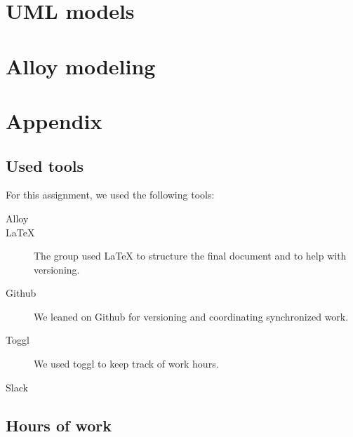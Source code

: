\documentclass{article}
\begin{document}
	\newpage
	\section{UML models}
	

	\newpage
	\section{Alloy modeling}

	\newpage
	\section{Appendix}
		\listoffigures
		\listoftables
		
		\subsection{Used tools}
		For this assignment, we used the following tools:
		
		\begin{description}
			\item [Alloy]
			\item [LaTeX] The group used LaTeX to structure the final document and to help with versioning.
			\item [Github] We leaned on Github for versioning and coordinating synchronized work.
			\item [Toggl] We used toggl to keep track of work hours.
			\item [Slack]  
			
		\end{description}
		
		\subsection{Hours of work}
\end{document}
